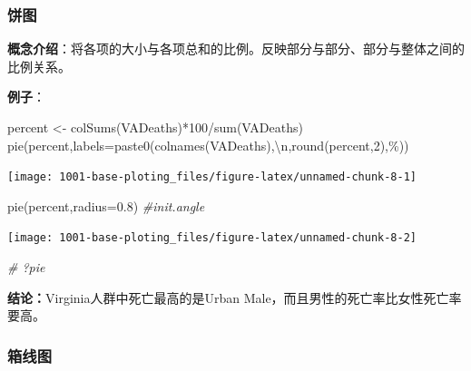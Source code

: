 \documentclass[
]{book}
\newenvironment{Shaded}{\begin{snugshade}}{\end{snugshade}}
\newcommand{\AttributeTok}[1]{\textcolor[rgb]{0.77,0.63,0.00}{#1}}
\newcommand{\CommentTok}[1]{\textcolor[rgb]{0.56,0.35,0.01}{\textit{#1}}}
\newcommand{\DecValTok}[1]{\textcolor[rgb]{0.00,0.00,0.81}{#1}}
\newcommand{\FloatTok}[1]{\textcolor[rgb]{0.00,0.00,0.81}{#1}}
\newcommand{\FunctionTok}[1]{\textcolor[rgb]{0.00,0.00,0.00}{#1}}
\newcommand{\NormalTok}[1]{#1}
\newcommand{\OtherTok}[1]{\textcolor[rgb]{0.56,0.35,0.01}{#1}}
\newcommand{\SpecialCharTok}[1]{\textcolor[rgb]{0.00,0.00,0.00}{#1}}
\newcommand{\StringTok}[1]{\textcolor[rgb]{0.31,0.60,0.02}{#1}}
\begin{document}
\hypertarget{ux997cux56fe}{%
\subsubsection{饼图}\label{ux997cux56fe}}

\textbf{概念介绍}：将各项的大小与各项总和的比例。反映部分与部分、部分与整体之间的比例关系。

\textbf{例子}：

\begin{Shaded}
\begin{Highlighting}[]
\NormalTok{percent }\OtherTok{\textless{}{-}} \FunctionTok{colSums}\NormalTok{(VADeaths)}\SpecialCharTok{*}\DecValTok{100}\SpecialCharTok{/}\FunctionTok{sum}\NormalTok{(VADeaths)}
\FunctionTok{pie}\NormalTok{(percent,}\AttributeTok{labels=}\FunctionTok{paste0}\NormalTok{(}\FunctionTok{colnames}\NormalTok{(VADeaths),}\StringTok{\textquotesingle{}}\SpecialCharTok{\textbackslash{}n}\StringTok{\textquotesingle{}}\NormalTok{,}\FunctionTok{round}\NormalTok{(percent,}\DecValTok{2}\NormalTok{),}\StringTok{\textquotesingle{}\%\textquotesingle{}}\NormalTok{))}
\end{Highlighting}
\end{Shaded}

\begin{center}\texttt{[image: 1001-base-ploting\_files/figure-latex/unnamed-chunk-8-1]} \end{center}

\begin{Shaded}
\begin{Highlighting}[]
\FunctionTok{pie}\NormalTok{(percent,}\AttributeTok{radius=}\FloatTok{0.8}\NormalTok{) }\CommentTok{\#init.angle}
\end{Highlighting}
\end{Shaded}

\begin{center}\texttt{[image: 1001-base-ploting\_files/figure-latex/unnamed-chunk-8-2]} \end{center}

\begin{Shaded}
\begin{Highlighting}[]
\CommentTok{\# ?pie}
\end{Highlighting}
\end{Shaded}

\textbf{结论：}Virginia人群中死亡最高的是Urban Male，而且男性的死亡率比女性死亡率要高。

\hypertarget{ux7bb1ux7ebfux56fe}{%
\subsubsection{箱线图}\label{ux7bb1ux7ebfux56fe}}
\end{document}
